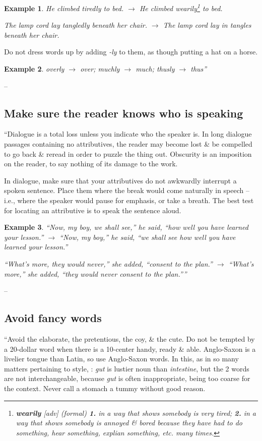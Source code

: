 \documentclass[oneside]{book}
\numberwithin{equation}{section}
\newtheorem{example}{Example}[chapter]
\begin{document}
\begin{example}
	He climbed tiredly to bed. $\to$ He climbed wearily\footnote{\textbf{wearily} [adv] (\textit{formal}) \textbf{1.} in a way that shows somebody is very tired; \textbf{2.} in a way that shows somebody is annoyed \& bored because they have had to do something, hear something, explian something, etc. many times.} to bed.
	
	The lamp cord lay tangledly beneath her chair. $\to$ The lamp cord lay in tangles beneath her chair.
\end{example}
Do not dress words up by adding \textit{-ly} to them, as though putting a hat on a horse.

\begin{example}
	overly $\to$ over; muchly $\to$ much; thusly $\to$ thus''
\end{example}
-- \cite[Chap. 5, Sect. 12, p. 90]{Strunk_White2019}

\subsection{Make sure the reader knows who is speaking}
``Dialogue is a total loss unless you indicate who the speaker is. In long dialogue passages containing no attributives, the reader may become lost \& be compelled to go back \& reread in order to puzzle the thing out. Obscurity is an imposition on the reader, to say nothing of its damage to the work.

In dialogue, make sure that your attributives do not awkwardly interrupt a spoken sentence. Place them where the break would come naturally in speech -- i.e., where the speaker would pause for emphasis, or take a breath. The best test for locating an attributive is to speak the sentence aloud.

\begin{example}
	``Now, my boy, we shall see,'' he said, ``how well you have learned your lesson.'' $\to$ ``Now, my boy,'' he said, ``we shall see how well you have learned your lesson.''
	
	``What's more, they would never,'' she added, ``consent to the plan.'' $\to$ ``What's more,'' she added, ``they would never consent to the plan.''''
\end{example}
-- \cite[Chap. 5, Sect. 13, p. 91]{Strunk_White2019}

\subsection{Avoid fancy words}
``Avoid the elaborate, the pretentious, the coy, \& the cute. Do not be tempted by a 20-dollar word when there is a 10-center handy, ready \& able. Anglo-Saxon is a livelier tongue than Latin, so use Anglo-Saxon words. In this, as in so many matters pertaining to style, : \textit{gut} is lustier noun than \textit{intestine}, but the 2 words are not interchangeable, because \textit{gut} is often inappropriate, being too coarse for the context. Never call a stomach a tummy without good reason.
\end{document}

